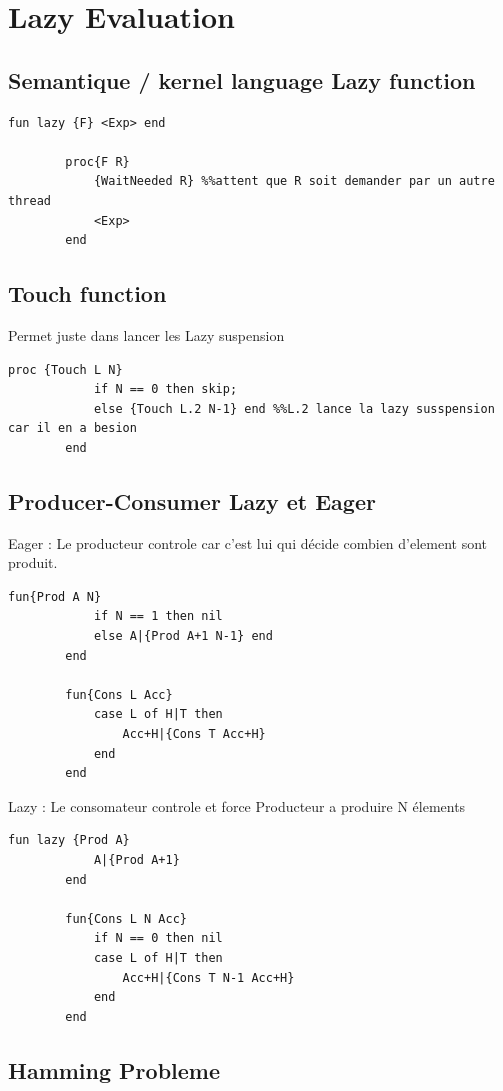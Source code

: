 \documentclass[a4paper,12pt]{scrartcl}
\begin{document}
\section{Lazy Evaluation}
	\subsection{Semantique / kernel language Lazy function}
	\begin{lstlisting}[language=OZ]		
		fun lazy {F} <Exp> end
		
		proc{F R}
			{WaitNeeded R} %%attent que R soit demander par un autre thread
			<Exp>
		end
	\end{lstlisting}
	
	\subsection{Touch function}
	Permet juste dans lancer les Lazy suspension
	\begin{lstlisting}[language=OZ]		
		proc {Touch L N}
			if N == 0 then skip;
			else {Touch L.2 N-1} end %%L.2 lance la lazy susspension car il en a besion
		end
	\end{lstlisting}
	
	\subsection{Producer-Consumer Lazy et Eager}
	
	Eager : Le producteur controle car c'est lui qui décide combien d'element sont produit.
	\begin{lstlisting}[language=OZ]	
		fun{Prod A N}
			if N == 1 then nil
			else A|{Prod A+1 N-1} end
		end
		
		fun{Cons L Acc}
			case L of H|T then
				Acc+H|{Cons T Acc+H}
			end
		end
	\end{lstlisting}
	
	Lazy : Le consomateur controle et force Producteur a produire N élements
	\begin{lstlisting}[language=OZ]	
		fun lazy {Prod A}
			A|{Prod A+1}
		end
		
		fun{Cons L N Acc}
			if N == 0 then nil
			case L of H|T then
				Acc+H|{Cons T N-1 Acc+H}
			end
		end
	\end{lstlisting}
	
	\subsection{Hamming Probleme}
	
\end{document}
